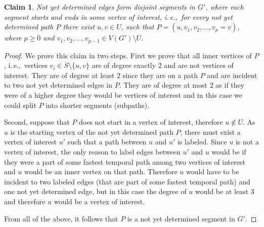 \documentclass[11pt,a4paper]{article}
\newtheorem{claim}[theorem]{Claim}
\theoremstyle{remark}
\theoremstyle{definition}
\newcommand{\ie}{i.\,e.,\ }
\begin{document}
\begin{claim}
    Not yet determined edges form disjoint segments in $G'$, where each segment starts and ends in some vertex of interest, 
    \ie for every not yet determined path $P$ there exist $u,v \in U$, such that $P = (u, v_1, v_2, \dots, v_p=v)$, where $p \geq 0$ and $v_1,v_2,\dots,v_{p-1} \in V(G') \setminus U$.
\end{claim}
\begin{proof}
    We prove this claim in two steps.
    First we prove that all inner vertices of $P$, \ie vertices $v_i \in  S \setminus \{u,v\}$ are of degree exactly $2$ and are not vertices of interest. 
    They are of degree at least $2$ since they are on a path $P$ and are incident to two not yet determined edges in  $P$.
    They are of degree at most $2$ as if they were of a higher degree they would be vertices of interest and in this case we could split $P$ into shorter segments (subpaths).
    
    Second, suppose that $P$ does not start in a vertex of interest, therefore $u \notin U$. As $u$ is the starting vertex of the not yet determined path $P$, there must exist a vertex of interest $u'$ such that a path between $u$ and $u'$ is labeled.
    Since $u$ is not a vertex of interest, the only reason to label edges between $u'$ and $u$ would be if they were a part of some fastest temporal path among two vertices of interest and $u$ would be an inner vertex on that path.
    Therefore $u$ would have to be incident to two labeled edges (that are part of some fastest temporal path) and one not yet determined edge, but in this case the degree of $u$ would be at least $3$ and therefore $u$ would be a vertex of interest.

    From all of the above, it follows that $P$ is a not yet determined segment in $G'$.
\end{proof}
\end{document}
